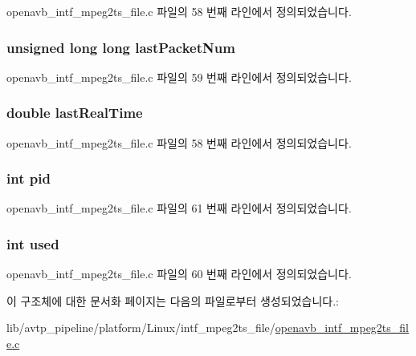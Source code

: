 openavb\+\_\+intf\+\_\+mpeg2ts\+\_\+file.\+c 파일의 58 번째 라인에서 정의되었습니다.

\subsubsection[{\texorpdfstring{last\+Packet\+Num}{lastPacketNum}}]{\setlength{\rightskip}{0pt plus 5cm}unsigned long long last\+Packet\+Num}\hypertarget{struct_p_i_d_status_af19060817d46a860713e88d67c0e7884}{}\label{struct_p_i_d_status_af19060817d46a860713e88d67c0e7884}


openavb\+\_\+intf\+\_\+mpeg2ts\+\_\+file.\+c 파일의 59 번째 라인에서 정의되었습니다.

\subsubsection[{\texorpdfstring{last\+Real\+Time}{lastRealTime}}]{\setlength{\rightskip}{0pt plus 5cm}double last\+Real\+Time}\hypertarget{struct_p_i_d_status_a615e2d868e1b5f28b84dc49ace77afdd}{}\label{struct_p_i_d_status_a615e2d868e1b5f28b84dc49ace77afdd}


openavb\+\_\+intf\+\_\+mpeg2ts\+\_\+file.\+c 파일의 58 번째 라인에서 정의되었습니다.

\subsubsection[{\texorpdfstring{pid}{pid}}]{\setlength{\rightskip}{0pt plus 5cm}int pid}\hypertarget{struct_p_i_d_status_af500917c052066b40cf47f96b43c607b}{}\label{struct_p_i_d_status_af500917c052066b40cf47f96b43c607b}


openavb\+\_\+intf\+\_\+mpeg2ts\+\_\+file.\+c 파일의 61 번째 라인에서 정의되었습니다.

\subsubsection[{\texorpdfstring{used}{used}}]{\setlength{\rightskip}{0pt plus 5cm}int used}\hypertarget{struct_p_i_d_status_a5810b6407672b8e7aeba609b4bb649de}{}\label{struct_p_i_d_status_a5810b6407672b8e7aeba609b4bb649de}


openavb\+\_\+intf\+\_\+mpeg2ts\+\_\+file.\+c 파일의 60 번째 라인에서 정의되었습니다.



이 구조체에 대한 문서화 페이지는 다음의 파일로부터 생성되었습니다.\+:\begin{DoxyCompactItemize}
\item 
lib/avtp\+\_\+pipeline/platform/\+Linux/intf\+\_\+mpeg2ts\+\_\+file/\hyperlink{openavb__intf__mpeg2ts__file_8c}{openavb\+\_\+intf\+\_\+mpeg2ts\+\_\+file.\+c}\end{DoxyCompactItemize}
